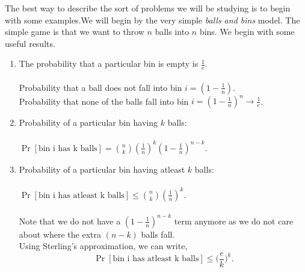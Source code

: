 \documentclass[a4paper,english,12pt]{article}
\begin{document}
\par The best way to describe the sort of problems we will be studying is to begin
with some examples.We will begin by the very simple \emph{balls and bins} model. The simple game is that we want to throw $n$ balls into $n$ bins.  We begin with some useful results.
\begin{enumerate}
\item The probability that a particular bin is empty is $\frac{1}{e}$.\\\\
Probability that a ball does not fall into bin $i = (1-\frac{1}{n})$.\\
Probability that none of the balls fall into bin $i = (1-\frac{1}{n})^n \rightarrow \frac{1}{e}$.
\item  Probability of a particular bin having $k$ balls:\\\\
$\Pr[\text{bin i has k balls}] = {n \choose k}(\frac{1}{n})^k (1-\frac{1}{n})^{n-k}$.

\item Probability of a particular bin having atleast  $k$ balls:\\\\
$\Pr[\text{bin i has atleast k balls}] \leq {n \choose k}(\frac{1}{n})^k$.\\\\
Note that we do not have a $(1-\frac{1}{n})^{n-k}$ term anymore as we do not care about where the extra $(n-k)$ balls fall.\\
Using Sterling's approximation, we can write,
\[\Pr[\text{bin i has atleast k balls}] \leq \Big(\frac{e}{k}\Big)^k.\]

\end{enumerate}
\end{document}
